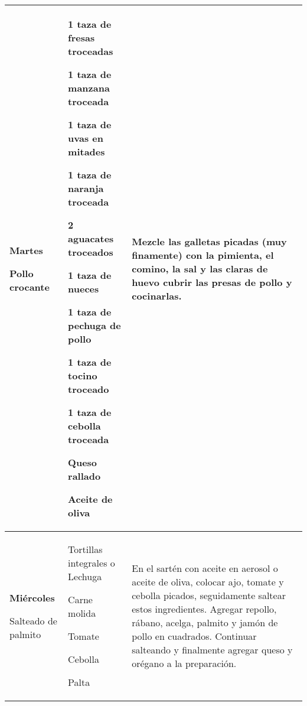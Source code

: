 \documentclass[menu.tex]{subfiles}
\begin{document}
\begin{tabular} {p{3cm} p{4.5cm} p{9cm}}
\pbox{20cm}
{
    \rule{0pt}{3ex}\begin{large}\textbf{Martes}\end{large}\\ 
    \rule{0pt}{2ex}Pollo crocante
}& 
\vspace{-0.4cm}            
\begin{compactitem} 
    \begin{scriptsize}
        \item 1 taza de fresas troceadas
        \item 1 taza de manzana troceada
        \item 1 taza de uvas en mitades
        \item 1 taza de naranja troceada
        \item 2 aguacates troceados
        \item 1 taza de nueces
        \item 1 taza de pechuga de pollo
        \item 1 taza de tocino troceado
        \item 1 taza de cebolla troceada
        \item Queso rallado
        \item Aceite de oliva               
    \end{scriptsize}
\end{compactitem}&
\vspace{-0.4cm}
Mezcle las galletas picadas (muy finamente) con la pimienta, el comino, la sal y las claras de huevo cubrir las presas de pollo y cocinarlas.\\
\hline

\pbox{20cm}
{
    \rule{0pt}{3ex}\begin{large}\textbf{Miércoles}\end{large}\\
    \rule{0pt}{2ex}Salteado de palmito
}&
\vspace{-0.4cm}
\begin{compactitem} 
    \begin{footnotesize}
        \item Tortillas integrales o Lechuga
        \item Carne molida
        \item Tomate
        \item Cebolla
        \item Palta
    \end{footnotesize}
\end{compactitem}&
\vspace{-0.4cm}
En el sartén con aceite en aerosol o aceite de oliva, colocar ajo, tomate y cebolla picados, seguidamente saltear estos ingredientes. Agregar repollo, rábano, acelga, palmito y jamón de pollo en cuadrados. Continuar salteando y finalmente agregar queso y orégano a la preparación.\\
\hline


\end{tabular}
\end{document}

